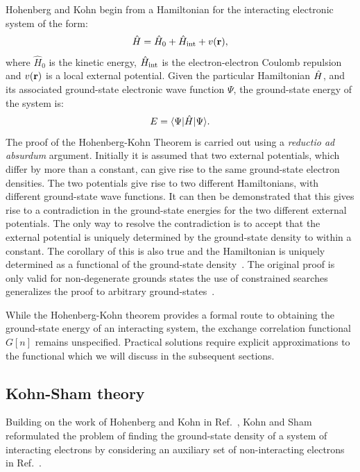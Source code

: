 Hohenberg and Kohn begin from a Hamiltonian for the interacting electronic system of the form:
%
\begin{equation}
\hat{H} = \hat{H}_{0} + \hat{H}_{\rm{int}} + v({\bf r}),
\end{equation}
%
where $\hat{H}_{0}$ is the kinetic energy, $\hat{H}_{\rm{int}}$ is the electron-electron Coulomb repulsion
and $v({\bf r})$ is a local external potential. Given the particular Hamiltonian $\hat{H}$, and its associated
ground-state electronic wave function $\Psi$, the ground-state energy of the system is: 
%
\begin{equation}
E = \langle \Psi | \hat{H} | \Psi \rangle.
\end{equation}
%
The proof of the Hohenberg-Kohn Theorem is carried out using a {\it reductio ad absurdum} argument.
Initially it is assumed that two external potentials, which differ by more than
a constant, can give rise to the same ground-state electron densities. The two potentials
give rise to two different Hamiltonians, with different ground-state wave functions. It
can then be demonstrated that this gives rise to a contradiction in the ground-state
energies for the two different external potentials. The only way to resolve the contradiction
is to accept that the external potential is uniquely determined by the ground-state density to 
within a constant. The corollary of this is also true and the Hamiltonian is uniquely determined
as a functional of the ground-state density~\cite{martin}. The original proof is only valid
for non-degenerate grounds states the use of constrained searches generalizes the proof
to arbitrary ground-states~\cite{levy79, levy82, lieb83}.

While the Hohenberg-Kohn theorem provides a formal route to obtaining the ground-state energy of 
an interacting system, the exchange correlation functional $G[n]$ remains unspecified. 
Practical solutions require explicit approximations to the functional which we will discuss in the
subsequent sections.

\subsection{Kohn-Sham theory}
\noindent
Building on the work of Hohenberg and Kohn in Ref.~\cite{hohenbergkohn64}, Kohn
and Sham reformulated 
the problem of finding the ground-state density of a system of interacting electrons 
by considering an auxiliary set of non-interacting electrons in Ref.~\cite{kohnsham65}.
 

